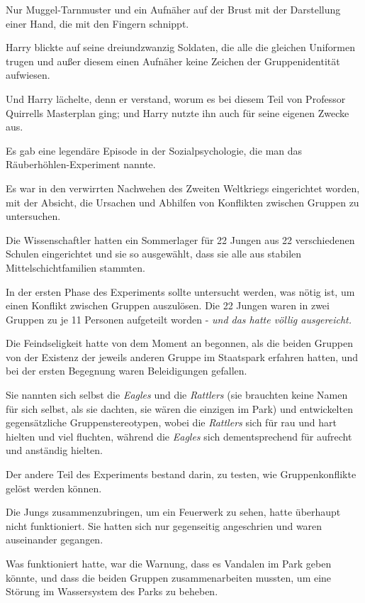 {Nur Muggel-Tarnmuster und ein Aufnäher auf der Brust mit der Darstellung einer Hand, die mit den Fingern schnippt.

Harry blickte auf seine dreiundzwanzig Soldaten, die alle die gleichen Uniformen trugen und außer diesem einen Aufnäher keine Zeichen der Gruppenidentität aufwiesen.

Und Harry lächelte, denn er verstand, worum es bei diesem Teil von Professor Quirrells Masterplan ging; und Harry nutzte ihn auch für seine eigenen Zwecke aus.

Es gab eine legendäre Episode in der Sozialpsychologie, die man das Räuberhöhlen-Experiment nannte.

Es war in den verwirrten Nachwehen des Zweiten Weltkriegs eingerichtet worden, mit der Absicht, die Ursachen und Abhilfen von Konflikten zwischen Gruppen zu untersuchen.

Die Wissenschaftler hatten ein Sommerlager für 22 Jungen aus 22 verschiedenen Schulen eingerichtet und sie so ausgewählt, dass sie alle aus stabilen Mittelschichtfamilien stammten.

In der ersten Phase des Experiments sollte untersucht werden, was nötig ist, um einen Konflikt zwischen Gruppen auszulösen. Die 22 Jungen waren in zwei Gruppen zu je 11 Personen aufgeteilt worden - \emph{und das hatte völlig ausgereicht.}

Die Feindseligkeit hatte von dem Moment an begonnen, als die beiden Gruppen von der Existenz der jeweils anderen Gruppe im Staatspark erfahren hatten, und bei der ersten Begegnung waren Beleidigungen gefallen.

Sie nannten sich selbst die \emph{Eagles} und die \emph{Rattlers} (sie brauchten keine Namen für sich selbst, als sie dachten, sie wären die einzigen im Park) und entwickelten gegensätzliche Gruppenstereotypen, wobei die \emph{Rattlers} sich für rau und hart hielten und viel fluchten, während die \emph{Eagles} sich dementsprechend für aufrecht und anständig hielten.

Der andere Teil des Experiments bestand darin, zu testen, wie Gruppenkonflikte gelöst werden können.

Die Jungs zusammenzubringen, um ein Feuerwerk zu sehen, hatte überhaupt nicht funktioniert. Sie hatten sich nur gegenseitig angeschrien und waren auseinander gegangen.

Was funktioniert hatte, war die Warnung, dass es Vandalen im Park geben könnte, und dass die beiden Gruppen zusammenarbeiten mussten, um eine Störung im Wassersystem des Parks zu beheben.

}
